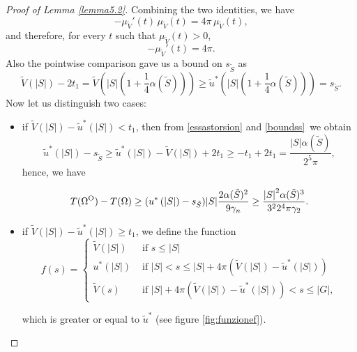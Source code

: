\documentclass[10pt,a4paper]{amsart}
\newcommand{\OO}{\text{\normalfont  O}}
\newcommand{\abs}[1]{{\left|#1\right|}}
\begin{document}
\begin{proof}[Proof of Lemma \ref{lemma5.2}]
Combining the two identities, we have
\[
-\mu_{\tilde V}'(t)\,\mu_{\tilde V}(t) = 4\pi\,\mu_{\tilde V}(t),
\]
and therefore, for every $t$ such that $\mu_{\tilde V}(t)>0$,
\begin{equation}\label{muprimo=4pi}
-\mu_{\tilde V}'(t) = 4\pi.
\end{equation} 
     Also the pointwise comparison gave us a bound on $s_{\tilde{S}}$ as
    \begin{equation}\label{boundss}
        \tilde V(\abs{S})-2t_1=\tilde V\left(\abs{S}\left(1+\frac{1}{4}\alpha(\tilde{S})\right)\right)\geq\tilde u^\ast\left(\abs{S}\left(1+\frac{1}{4}\alpha(\tilde{S})\right)\right)=s_{\tilde{S}}.
    \end{equation}
    Now let us distinguish two cases:
    \begin{itemize}
        \item if $\tilde V(\abs{S})-\tilde u^\ast(\abs{S})<t_1$, then from \eqref{essastorsion} and \eqref{boundss}\, we obtain
        \begin{equation*}
            {\tilde u}^\ast(\abs{S})-s_{\tilde{S}}\geq\tilde u^\ast(\abs{S})-\tilde V(\abs{S})+2t_1\geq -t_1+2t_1=\frac{\abs{S}\alpha(\tilde{S})}{2^5\pi},
         \end{equation*}
        hence, we have

         \begin{equation*}
              T(\Omega^\OO)-T(\Omega)\geq   (u^\ast\left(\abs{S}\right) -s_{\tilde{S}})\abs{S}\frac{2\alpha({\tilde{S}})^2}{9\gamma_n} \geq \frac{\abs{S}^2\alpha(\tilde{S})^3}{3^22^4\pi \gamma_ 2}.
         \end{equation*}


         \item if $\tilde V(\abs{S})-\tilde u^\ast(\abs{S})\geq t_1$, we define the function \begin{equation*}%
          f(s)=
         \begin{cases}
         \tilde V (\abs{S}) & \text{ if } s \leq \abs{S}\\
             u^\ast (\abs{S})& \text{ if }  \abs{S} < s \leq \abs{S} + 4\pi \left(\tilde V(\abs{S})-\tilde u^\ast(\abs{S})\right) \\
              \tilde V(s)& \text{ if }  \abs{S} + 4 \pi \left(\tilde V(\abs{S})-\tilde u^\ast(\abs{S})\right)   <s \leq \abs{G},
         \end{cases}\end{equation*}
         
         which is greater or equal to $\tilde u^\ast$ (see figure \ref{fig:funzionef}).
         

\end{itemize}
\end{proof}
\end{document}
